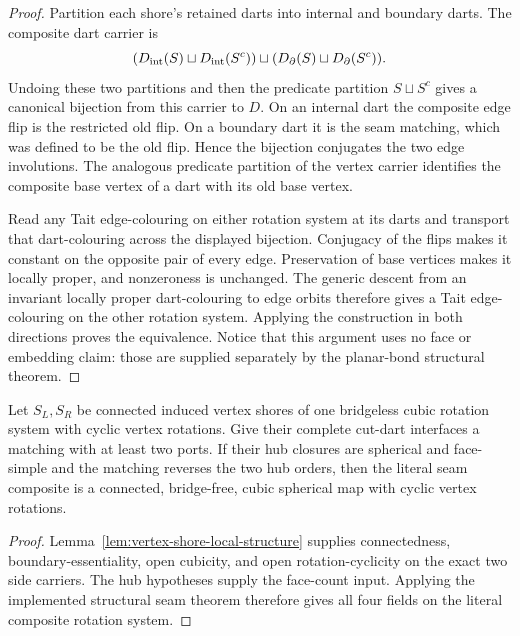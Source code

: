 \begin{proof}
Partition each shore's retained darts into internal and boundary darts.  The
composite dart carrier is
\[
  (D_{\rm int}(S)\sqcup D_{\rm int}(S^c))
    \sqcup(D_{\partial}(S)\sqcup D_{\partial}(S^c)).
\]
Undoing these two partitions and then the predicate partition \(S\sqcup S^c\)
gives a canonical bijection from this carrier to \(D\).  On an internal dart
the composite edge flip is the restricted old flip.  On a boundary dart it
is the seam matching, which was defined to be the old flip.  Hence the
bijection conjugates the two edge involutions.  The analogous predicate
partition of the vertex carrier identifies the composite base vertex of a
dart with its old base vertex.

Read any Tait edge-colouring on either rotation system at its darts and
transport that dart-colouring across the displayed bijection.  Conjugacy of
the flips makes it constant on the opposite pair of every edge.  Preservation
of base vertices makes it locally proper, and nonzeroness is unchanged.
The generic descent from an invariant locally proper dart-colouring to edge
orbits therefore gives a Tait edge-colouring on the other rotation system.
Applying the construction in both directions proves the equivalence.  Notice
that this argument uses no face or embedding claim: those are supplied
separately by the planar-bond structural theorem.
\end{proof}

\begin{corollary}
\label{cor:literal-shores-structural-splice}
Let \(S_L,S_R\) be connected induced vertex shores of one bridgeless cubic
rotation system with cyclic vertex rotations.  Give their complete cut-dart
interfaces a matching with at least two ports.  If their hub closures are
spherical and face-simple and the matching reverses the two hub orders, then
the literal seam composite is a connected, bridge-free, cubic spherical map
with cyclic vertex rotations.
\end{corollary}

\begin{proof}
Lemma~\ref{lem:vertex-shore-local-structure} supplies connectedness,
boundary-essentiality, open cubicity, and open rotation-cyclicity on the
exact two side carriers.  The hub hypotheses supply the face-count input.
Applying the implemented structural seam theorem therefore gives all four
fields on the literal composite rotation system.
\end{proof}

